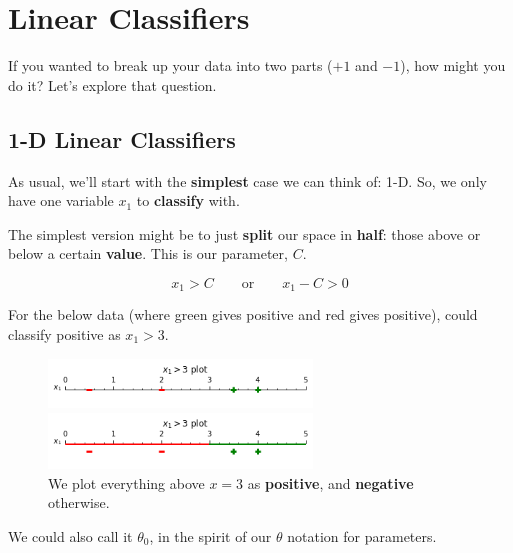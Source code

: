 
\section*{Linear Classifiers}

    If you wanted to break up your data into two parts ($+1$ and $-1$), how might you do it? Let's explore that question.
    
    \subsection*{1-D Linear Classifiers}
    
        As usual, we'll start with the \textbf{simplest} case we can think of: 1-D. So, we only have one variable $x_1$ to \textbf{classify} with.
        
        The simplest version might be to just \textbf{split} our space in \textbf{half}: those above or below a certain \textbf{value}. This is our parameter, $C$.
        
        \begin{equation}
            x_1 > C \qquad \text{or} \qquad x_1 - C > 0
        \end{equation}
        
        \miniex For the below data (where green gives positive and red gives positive), could classify positive as $x_1>3$.
        
        \begin{figure}[H]
            \centering
            \includegraphics[width=70mm,scale=0.4]{images/classification_images/x1_1d_plot_points.png}

            \includegraphics[width=70mm,scale=0.4]{images/classification_images/x1_1d_plot.png}
            
            \caption*{We plot everything above $x=3$ as \textbf{positive}, and \textbf{negative} otherwise.}
        \end{figure}
        
        We could also call it $\theta_0$, in the spirit of our $\theta$ notation for parameters.
        
